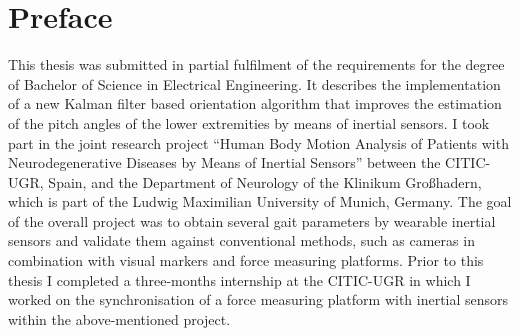 \chapter{Preface}

This thesis was submitted in partial fulfilment of the requirements for the degree of Bachelor of Science in Electrical Engineering. It describes the implementation of a new Kalman filter based orientation algorithm that improves the estimation of the pitch angles of the lower extremities by means of inertial sensors. I took part in the joint research project “Human Body Motion Analysis of Patients with Neurodegenerative Diseases by Means of Inertial Sensors” between the \gls{CITIC-UGR}, Spain, and the Department of Neurology of the Klinikum Großhadern, which is part of the Ludwig Maximilian University of Munich, Germany. The goal of the overall project was to obtain several gait parameters by wearable inertial sensors and validate them against conventional methods, such as cameras in combination with visual markers and force measuring platforms. Prior to this thesis I completed a three-months internship at the \gls{CITIC-UGR} in which I worked on the synchronisation of a force measuring platform with inertial sensors within the above-mentioned project.